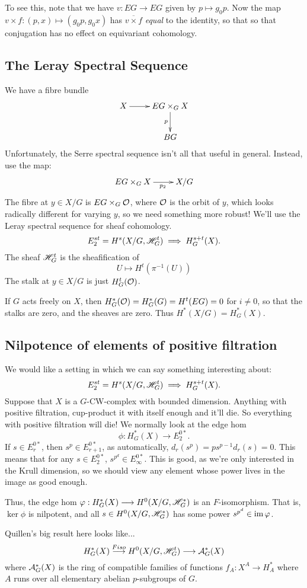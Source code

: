 \documentclass[11pt]{article}
\begin{document}
\begin{JeromyQuillenPractice}
To see this, note that we have $v:EG\to EG$ given by $p\mapsto g_0p$. Now the map $v\times f:(p,x)\mapsto(g_0p,g_0x)$ has $\overline{v\times f}$ \emph{equal} to the identity, so that so that conjugation has no effect on equivariant cohomology.
\subsection*{The Leray Spectral Sequence}
We have a fibre bundle
\[\xymatrix{
X\ar[r]&EG\times_G X\ar[d]_p\\
&BG
}\]
Unfortunately, the Serre spectral sequence isn't all that useful in general. Instead, use the map:
\[\xymatrix{
EG\times_G X\ar[r]_{\ \ \ p_2}&X/G
}\]
The fibre at $y\in X/G$ is $EG\times_G\mathcal{O}$, where $\mathcal{O}$ is the orbit of $y$, which looks radically different for varying $y$, so we need something more robust! We'll use the Leray spectral sequence for sheaf cohomology.
\[E_2^{st}=H^s(X/G,\mathscr{H}_G^t)\implies H_G^{s+t}(X).\]
The sheaf $\mathscr{H}_G^t$ is the sheafification of
\[U\mapsto H^t(\pi^{-1}(U))\]
The stalk at $y\in X/G$ is just $H^t_G(\mathcal{O})$.
\begin{exmp*}
If $G$ acts freely on $X$, then $H_G^*(\mathcal{O})=H_G^*(G)=H^t(EG)=0$ for $i\neq0$, so that the stalks are zero, and the sheaves are zero. Thus $H^*(X/G)=H_G^*(X)$.
\end{exmp*}
\subsection*{Nilpotence of elements of positive filtration}
We would like a setting in which we can say something interesting about:
\[E_2^{st}=H^s(X/G,\mathscr{H}_G^t)\implies H_G^{s+t}(X).\]
Suppose that $X$ is a $G$-CW-complex with bounded dimension. Anything with positive filtration, cup-product it with itself enough and it'll die. So everything with positive filtration will die! We normally look at the edge hom
\[\phi:H^*_G(X)\to E^{0*}_2.\]
If $s\in E_r^{0*}$, then $s^p\in E_{r+1}^{0*}$, as automatically, $d_r(s^p)=ps^{p-1} d_r(s)=0$. This means that for any $s\in E_2^{0*}$, $s^{p^d}\in E_\infty^{0*}$. This is good, as we're only interested in the Krull dimension, so we should view any element whose power lives in the image as good enough.

Thus, the edge hom $\varphi:H^*_G(X)\longrightarrow H^0(X/G,\mathscr{H}^*_G)$ is an $F$-isomorphism. That is, $\ker\phi$ is nilpotent, and all $s\in H^0(X/G,\mathscr{H}^*_G)$ has some power $s^{p^d}\in\operatorname{im}\varphi$.

Quillen's big result here looks like...
\[H^*_G(X)\overset{Fiso}{\longrightarrow} H^0(X/G,\mathscr{H}_G^t)\longrightarrow \mathcal{A}_G^*(X)\]
where $\mathcal{A}_G^*(X)$ is the ring of compatible families of functions $f_A:X^A\to H^*_A$ where $A$ runs over all elementary abelian $p$-subgroups of $G$.


\end{JeromyQuillenPractice}
\end{document}

